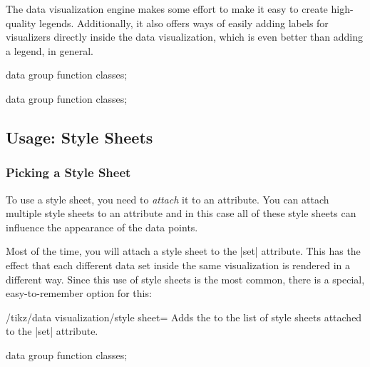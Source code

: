 The data visualization engine makes some effort to make it easy to create
high-quality legends. Additionally, it also offers ways of easily adding labels
for visualizers directly inside the data visualization, which is even better
than adding a legend, in general.
%
\begin{codeexample}[width=7cm]
\tikz \datavisualization [
  school book axes, all axes={unit length=7.5mm},
  x axis={label=$x$},
  visualize as smooth line/.list={log, lin, squared, exp},
  log=    {label in legend={text=$\log x$}},
  lin=    {label in legend={text=$x/2$}},
  squared={label in legend={text=$x^2$}},
  exp=    {label in legend={text=$e^x$}},
  style sheet=vary dashing]
data group {function classes};
\end{codeexample}

\begin{codeexample}[width=6.3cm]
\tikz \datavisualization [
  school book axes,
  x axis={label=$x$},
  visualize as smooth line/.list={log, lin, squared, exp},
  every data set label/.append style={text colored},
  log=    {pin in data={text'=$\log x$, when=y is -1}},
  lin=    {pin in data={text=$x/2$, when=x is 2,
                        pin length=1ex}},
  squared={pin in data={text=$x^2$, when=x is 1.1,
                        pin angle=230}},
  exp=    {label in data={text=$e^x$, when=x is -2}},
  style sheet=vary hue]
data group {function classes};
\end{codeexample}


\subsection{Usage: Style Sheets}

\subsubsection{Picking a Style Sheet}

To use a style sheet, you need to \emph{attach} it to an attribute. You can
attach multiple style sheets to an attribute and in this case all of these
style sheets can influence the appearance of the data points.

Most of the time, you will attach a style sheet to the |set| attribute. This
has the effect that each different data set inside the same visualization is
rendered in a different way. Since this use of style sheets is the most common,
there is a special, easy-to-remember option for this:

\begin{key}{/tikz/data visualization/style sheet=}
    Adds the  to the list of style sheets attached to the
    |set| attribute.
\begin{codeexample}[width=6cm]
\tikz \datavisualization [
  school book axes, all axes={unit length=7.5mm},
  visualize as smooth line/.list={log, lin, squared, exp},
  style sheet=vary thickness and dashing,
  style sheet=vary hue]
data group {function classes};
\end{codeexample}
\end{key}

